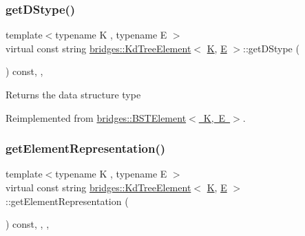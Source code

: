 \subsubsection{\texorpdfstring{getDStype()}{getDStype()}}
{\footnotesize\ttfamily template$<$typename K , typename E $>$ \\
virtual const string \mbox{\hyperlink{classbridges_1_1_kd_tree_element}{bridges\+::\+Kd\+Tree\+Element}}$<$ \mbox{\hyperlink{namespacebridges_acfb0a4f7877d8f63de3e6862004c50edaa5f3c6a11b03839d46af9fb43c97c188}{K}}, \mbox{\hyperlink{namespacebridges_acfb0a4f7877d8f63de3e6862004c50eda3a3ea00cfc35332cedf6e5e9a32e94da}{E}} $>$\+::get\+D\+Stype (\begin{DoxyParamCaption}{ }\end{DoxyParamCaption}) const\hspace{0.3cm}{\ttfamily [inline]}, {\ttfamily [override]}, {\ttfamily [virtual]}}

\begin{DoxyReturn}{Returns}
the data structure type 
\end{DoxyReturn}


Reimplemented from \mbox{\hyperlink{classbridges_1_1_b_s_t_element_af3843873c508c24f90b6e73a6f490bf8}{bridges\+::\+B\+S\+T\+Element$<$ K, E $>$}}.

\mbox{\label{classbridges_1_1_kd_tree_element_ad8aa2d89689f33691063fee9c601e2cb}} 
\subsubsection{\texorpdfstring{getElementRepresentation()}{getElementRepresentation()}}
{\footnotesize\ttfamily template$<$typename K , typename E $>$ \\
virtual const string \mbox{\hyperlink{classbridges_1_1_kd_tree_element}{bridges\+::\+Kd\+Tree\+Element}}$<$ \mbox{\hyperlink{namespacebridges_acfb0a4f7877d8f63de3e6862004c50edaa5f3c6a11b03839d46af9fb43c97c188}{K}}, \mbox{\hyperlink{namespacebridges_acfb0a4f7877d8f63de3e6862004c50eda3a3ea00cfc35332cedf6e5e9a32e94da}{E}} $>$\+::get\+Element\+Representation (\begin{DoxyParamCaption}{ }\end{DoxyParamCaption}) const\hspace{0.3cm}{\ttfamily [inline]}, {\ttfamily [override]}, {\ttfamily [protected]}, {\ttfamily [virtual]}}

